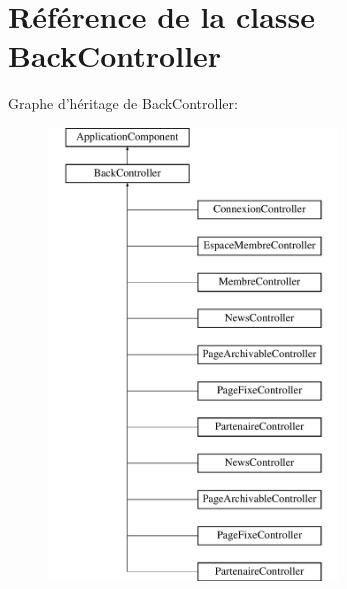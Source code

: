 \hypertarget{class_library_1_1_back_controller}{\section{Référence de la classe Back\+Controller}
\label{class_library_1_1_back_controller}
}
Graphe d'héritage de Back\+Controller\+:\begin{figure}[H]
\begin{center}
\leavevmode
\includegraphics[height=12.000000cm]{class_library_1_1_back_controller}
\end{center}
\end{figure}
